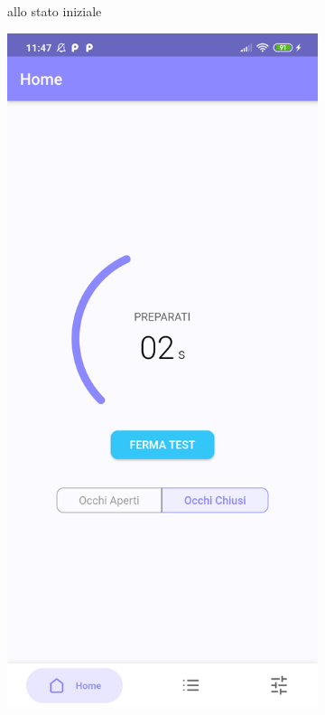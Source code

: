 \begin{figure}[!htb]
\begin{subfigure}{.35\textwidth}
        \caption{allo stato iniziale}
        \label{fig:home}
    \end{subfigure}
    \hspace{.15\textwidth}%
    \begin{subfigure}{.35\textwidth}
        \includegraphics[width=\textwidth]{figures/screenshot/redmi_note_8t/home_measure.png}

\end{subfigure}
\end{figure}
